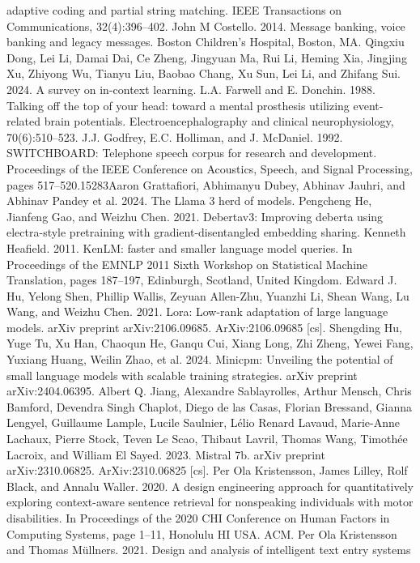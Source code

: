 adaptive coding and partial string matching. IEEE
Transactions on Communications, 32(4):396–402.
John M Costello. 2014. Message banking, voice banking and legacy messages. Boston Children’s Hospital,
Boston, MA.
Qingxiu Dong, Lei Li, Damai Dai, Ce Zheng, Jingyuan
Ma, Rui Li, Heming Xia, Jingjing Xu, Zhiyong Wu,
Tianyu Liu, Baobao Chang, Xu Sun, Lei Li, and
Zhifang Sui. 2024. A survey on in-context learning.
L.A. Farwell and E. Donchin. 1988. Talking off the top
of your head: toward a mental prosthesis utilizing
event-related brain potentials. Electroencephalography and clinical neurophysiology, 70(6):510–523.
J.J. Godfrey, E.C. Holliman, and J. McDaniel. 1992.
SWITCHBOARD: Telephone speech corpus for research and development. Proceedings of the IEEE
Conference on Acoustics, Speech, and Signal Processing, pages 517–520.15283Aaron Grattafiori, Abhimanyu Dubey, Abhinav Jauhri,
and Abhinav Pandey et al. 2024. The Llama 3 herd
of models.
Pengcheng He, Jianfeng Gao, and Weizhu Chen. 2021.
Debertav3: Improving deberta using electra-style pretraining with gradient-disentangled embedding sharing.
Kenneth Heafield. 2011. KenLM: faster and smaller language model queries. In Proceedings of the EMNLP
2011 Sixth Workshop on Statistical Machine Translation, pages 187–197, Edinburgh, Scotland, United
Kingdom.
Edward J. Hu, Yelong Shen, Phillip Wallis, Zeyuan
Allen-Zhu, Yuanzhi Li, Shean Wang, Lu Wang,
and Weizhu Chen. 2021. Lora: Low-rank adaptation of large language models. arXiv preprint
arXiv:2106.09685. ArXiv:2106.09685 [cs].
Shengding Hu, Yuge Tu, Xu Han, Chaoqun He, Ganqu
Cui, Xiang Long, Zhi Zheng, Yewei Fang, Yuxiang Huang, Weilin Zhao, et al. 2024. Minicpm:
Unveiling the potential of small language models
with scalable training strategies. arXiv preprint
arXiv:2404.06395.
Albert Q. Jiang, Alexandre Sablayrolles, Arthur Mensch, Chris Bamford, Devendra Singh Chaplot, Diego
de las Casas, Florian Bressand, Gianna Lengyel, Guillaume Lample, Lucile Saulnier, Lélio Renard Lavaud,
Marie-Anne Lachaux, Pierre Stock, Teven Le Scao,
Thibaut Lavril, Thomas Wang, Timothée Lacroix,
and William El Sayed. 2023. Mistral 7b. arXiv
preprint arXiv:2310.06825. ArXiv:2310.06825 [cs].
Per Ola Kristensson, James Lilley, Rolf Black, and Annalu Waller. 2020. A design engineering approach
for quantitatively exploring context-aware sentence
retrieval for nonspeaking individuals with motor disabilities. In Proceedings of the 2020 CHI Conference
on Human Factors in Computing Systems, page 1–11,
Honolulu HI USA. ACM.
Per Ola Kristensson and Thomas Müllners. 2021. Design and analysis of intelligent text entry systems

